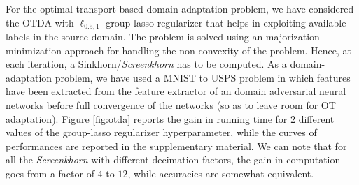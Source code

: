For the optimal transport based domain adaptation problem, we have considered the
OTDA with $\ell_{0.5,1}$ group-lasso regularizer that helps in exploiting available labels in the source domain. The problem is solved using an majorization-minimization approach 
for handling the non-convexity of the problem. Hence, at each iteration, a Sinkhorn/\emph{Screenkhorn} has to be computed. As a domain-adaptation problem, we have
used a MNIST to USPS problem in which features have been extracted from the
feature extractor of an domain adversarial neural networks \citep{ganin2016domain} before full convergence of the networks (so as to leave room for OT adaptation). 
Figure \ref{fig:otda} reports the gain in running time for $2$ different values
of the group-lasso regularizer hyperparameter, while the curves of performances are
reported in the supplementary material. We can note that for all the  \emph{Screenkhorn} with different decimation factors, the gain in computation goes from a factor of $4$ to $12$, while accuracies are somewhat equivalent.

